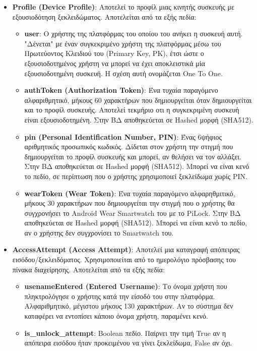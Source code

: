 	\begin{itemize}
		\item \textbf{Profile (Device Profile)}: Αποτελεί το προφίλ μιας κινητής συσκευής με εξουσιοδότηση ξεκλειδώματος. Αποτελείται από τα εξής πεδία:
		\begin{itemize}
			\item \textbf{user}: Ο χρήστης της πλατφόρμας του οποίου του ανήκει η συσκευή αυτή. "Δένεται" με έναν συγκεκριμένο χρήστη της πλατφόρμας μέσω του Πρωτεύοντος Κλειδιού του (Primary Key, PK), έτσι ώστε ο εξουσιοδοτημένος χρήστη να μπορεί να έχει αποκλειστικά μία εξουσιοδοτημένη συσκευή. Η σχέση αυτή ονομάζεται One To One.
			\item \textbf{authToken (Authorization Token)}: Ένα τυχαία παραγόμενο αλφαριθμητικό, μήκους 60 χαρακτήρων που δημιουργείται όταν δημιουργείται και το προφίλ συσκευής. Αποτελεί τεκμήριο οτι η συγκεκριμένη συσκευή είναι εξουσιοδοτημένη. Στην ΒΔ αποθηκεύεται σε Hashed μορφή (SHA512). 
			\item \textbf{pin (Personal Identification Number, PIN)}: Ένας 6ψήφιος αριθμητικός προσωπικός κωδικός. Δίδεται στον χρήστη την στιγμή που δημιουργείται το προφίλ συσκευής και μπορεί, αν θελήσει να τον αλλάξει. Στην ΒΔ αποθηκεύεται σε Hashed μορφή (SHA512). Μπορεί να είναι κενό το πεδίο, σε περίπτωση που ο χρήστης χρησιμοποιεί ξεκλείδωμα χωρίς PIN.
			\item \textbf{wearToken (Wear Token)}: Ένα τυχαία παραγόμενο αλφαρηθμιτικό, μήκους 30 χαρακτήρων που δημιουργείται την στιγμή που ο χρήστης θα συγχρονήσει το Android Wear Smartwatch του με το PiLock. Στην ΒΔ αποθηκεύεται σε Hashed μορφή (SHA512). Μπορεί να είναι κενό το πεδίο, αν ο χρήστης δεν συγχρονίσει το Smartwatch του.
		\end{itemize}
		\item \textbf{AccessAttempt (Access Attempt)}: Αποτελεί μια καταγραφή απόπειρας εισόδου/ξεκλειδόματος. Χρησιμοποιείται από το ημερολόγιο πρόσβασης του πίνακα διαχείρησης. Αποτελείται από τα εξής πεδία:
		\begin{itemize}
			\item \textbf{usenameEntered (Entered Username)}: Το όνομα χρήστη που πληκτρολόγησε ο χρήστης κατά την είσοδό του στην πλατφόρμα. Αλφαριθμητικό, μέγιστου μήκους 130 χαρακτήρων. Αν το σύστημα δεν καταφέρει να εντοπίσει κάποιο όνομα χρήστη, παραμένει κενό.
			\item \textbf{is\_unlock\_attempt}: Boolean πεδίο. Παίρνει την τιμή True αν η απόπειρα εισόδου ήταν προκειμένου να γίνει ξεκλείδωμα, False αν όχι.

\end{itemize}
\end{itemize}
